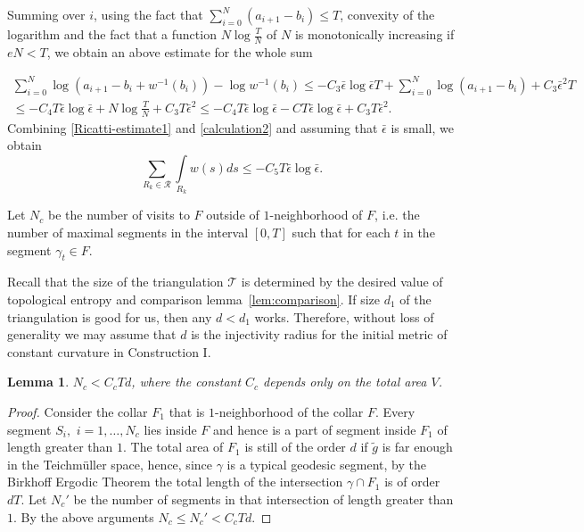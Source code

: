 \documentclass[12pt]{article}
\numberwithin{equation}{section}
\newtheorem{lem}{Lemma}[section]
\theoremstyle{definition}
\begin{document}
Summing over $i$, using the fact that $\sum_{i=0}^N (a_{i+1}-b_i)\le T$, convexity of the logarithm and the fact that a function $N\log\frac{T}{N}$ of $N$ is monotonically increasing if $eN<T$, we obtain an above estimate for the whole sum

\begin{align}\label{calculation2}
\sum_{i=0}^N\log (a_{i+1}-b_i+ w^{-1}(b_i))-\log w^{-1}(b_i)\leqslant-C_3\bar\epsilon\log\bar\epsilon T + \sum_{i=0}^N\log (a_{i+1}-b_i)+C_3\bar \epsilon^2T\\ \leqslant-C_4T\bar\epsilon\log\bar\epsilon + N\log\frac{T}{N} +C_3T\bar \epsilon^2 \leqslant-C_4T\bar\epsilon\log\bar\epsilon -CT\bar\epsilon\log\bar\epsilon +C_3T\bar \epsilon^2.\nonumber
\end{align}
 Combining \eqref{Ricatti-estimate1} and \eqref{calculation2} and assuming that $\bar\epsilon$ is small, we obtain 
 \begin{equation}\label{Ricatti-final}
\sum\limits_{R_k\in\mathcal R}\int\limits_{R_k}w(s) ds\leqslant-C_5T\bar\epsilon\log\bar\epsilon.
 \end{equation}

Let $N_c$ be the number of visits to $F$ outside of $1$-neighborhood of $F$, i.e. the number of maximal segments in the interval $[0,T]$ such that for each $t$ in the segment $\gamma_t\in F$. 

Recall that the size of the triangulation $\mathcal T$ is determined by the desired value of topological entropy and comparison lemma~\ref{lem:comparison}. If size $d_1$ of the triangulation is good for us, then any $d<d_1$ works. Therefore, without loss of generality we may assume that $d$ is the injectivity radius for the initial metric of constant curvature in Construction I. 

\begin{lem}\label{visits_collar} $N_c<C_c T d $, where the constant $C_c$ depends only on the total area $V$.
\end{lem}
\begin{proof} Consider the collar $F_1$ that is $1$-neighborhood of the collar $F$. Every segment $S_i,\,\,i=1,\dots,N_c$ lies inside $F$ and hence is a part of segment inside $F_1$ of length  greater than $1$. The total area of $F_1$ is still of the order $d$ if $\tilde g$ is far enough in the Teichm\"uller space, hence, since $\gamma$ is a typical geodesic segment, by the Birkhoff Ergodic Theorem  the total length of the intersection $\gamma\cap F_1$ is of order $d T$. Let $N_{c}'$ be the number of segments in that intersection of length greater than $1$. By the above arguments  $N_c\le N_{c}'<C_cTd $.   
\end{proof}
\end{document}
